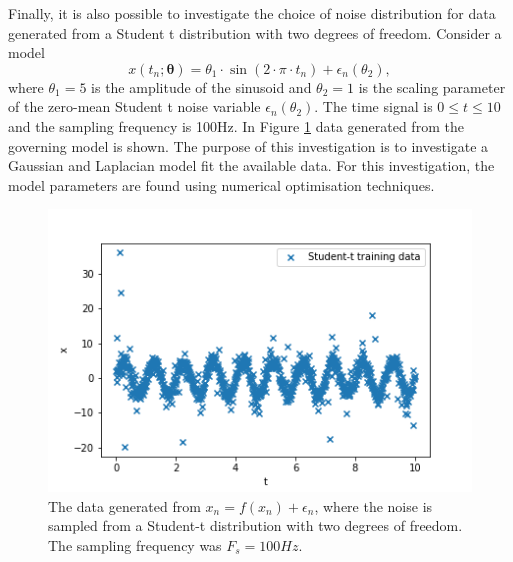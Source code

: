 \documentclass{article}
\begin{document}
Finally, it is also possible to investigate the choice of noise distribution for data generated from a Student t distribution with two degrees of freedom. Consider a model 
\begin{equation}
x(t_n;\boldsymbol\theta) = \theta_1 \cdot \sin \left(2\cdot\pi\cdot t_n\right) + \epsilon_n(\theta_2),
\end{equation}
where $\theta_1 = 5$ is the amplitude of the sinusoid and $\theta_2 = 1$ is the scaling parameter of the zero-mean Student t noise variable $\epsilon_n(\theta_2)$. The time signal is $0 \leq t \leq 10$ and the sampling frequency is 100Hz. In Figure \ref{fig:Q3c_1} data generated from the governing model is shown. The purpose of this investigation is to investigate a Gaussian and Laplacian model fit the available data. For this investigation, the model parameters are found using numerical optimisation techniques.
\begin{figure}[!htb]
    \centering
    \includegraphics[scale=0.8]{Q3c_fig1.png}
    \caption{The data generated from $x_n=f(x_n)+\epsilon_n$, where the noise is sampled from a Student-t distribution with two degrees of freedom. The sampling frequency was $F_s=100Hz$.}
    \label{fig:Q3c_1}
\end{figure}
\end{document}
